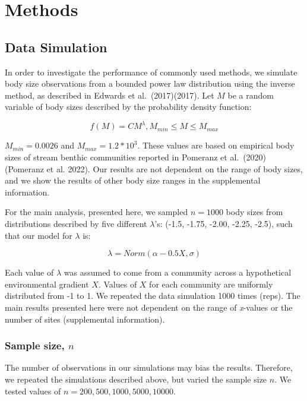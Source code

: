 \documentclass[
]{article}
\begin{document}
\hypertarget{methods}{%
\section{Methods}\label{methods}}

\hypertarget{data-simulation}{%
\subsection{Data Simulation}\label{data-simulation}}

In order to investigate the performance of commonly used methods, we
simulate body size observations from a bounded power law distribution
using the inverse method, as described in Edwards et al.~(2017)(2017).
Let \(M\) be a random variable of body sizes described by the
probability density function:

\[f(M) = CM^\lambda, M_{min} \le M \le M_{max} \]

\(M_{min} = 0.0026\) and \(M_{max} = 1.2 *10^3\). These values are based
on empirical body sizes of stream benthic communities reported in
Pomeranz et al.~(2020)(Pomeranz et al. 2022). Our results are not
dependent on the range of body sizes, and we show the results of other
body size ranges in the supplemental information.

For the main analysis, presented here, we sampled \(n = 1000\) body
sizes from distributions described by five different \(\lambda\)'s:
(-1.5, -1.75, -2.00, -2.25, -2.5), such that our model for \(\lambda\)
is:

\[\lambda = Norm(\alpha -0.5X, \sigma)\]

Each value of \(\lambda\) was assumed to come from a community across a
hypothetical environmental gradient \(X\). Values of \(X\) for each
community are uniformly distributed from -1 to 1. We repeated the data
simulation 1000 times (reps). The main results presented here were not
dependent on the range of \emph{x}-values or the number of sites
(supplemental information).

\hypertarget{sample-size-n}{%
\subsubsection{\texorpdfstring{Sample size,
\(n\)}{Sample size, n}}\label{sample-size-n}}

The number of observations in our simulations may bias the results.
Therefore, we repeated the simulations described above, but varied the
sample size \(n\). We tested values of
\(n = 200, 500, 1000, 5000, 10 000\).
\end{document}
